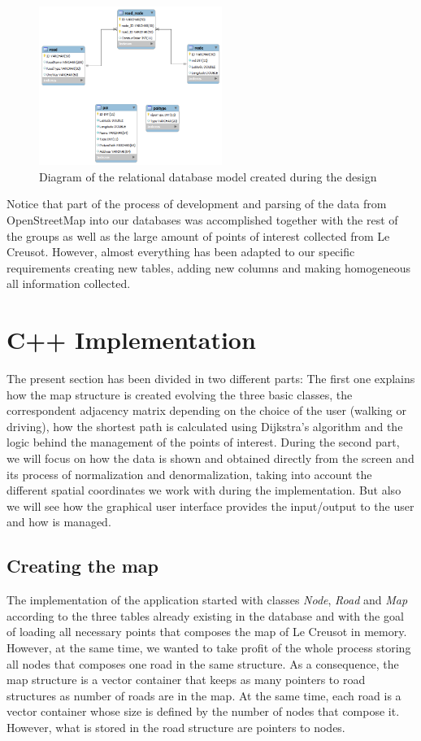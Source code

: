 \documentclass{article}
\begin{document}
\begin{figure}[h]
\centering
\includegraphics[width=0.53\textwidth]{big_schneider.png}
\caption{Diagram of the relational database model created during the design}
\label{fig:RelDBdiagram}
\end{figure}

Notice that part of the process of development and parsing of the data from OpenStreetMap into our databases was accomplished together with the rest of the groups as well as the large amount of points of interest collected from Le Creusot. However, almost everything has been adapted to our specific requirements creating new tables, adding new columns and making homogeneous all information collected. 

\clearpage
\section{C++ Implementation}
The present section has been divided in two different parts: The first one explains how the map structure is created evolving the three basic classes, the correspondent adjacency matrix depending on the choice of the user (walking or driving), how the shortest path is calculated using Dijkstra's algorithm and the logic behind the management of the points of interest. During the second part, we will focus on how the data is shown and obtained directly from the screen and its process of normalization and denormalization, taking into account the different spatial coordinates we work with during the implementation. But also we will see how the graphical user interface provides the input/output to the user and how is managed.

\subsection{Creating the map}
The implementation of the application started with classes \textit{Node}, \textit{Road} and \textit{Map} according to the three tables already existing in the database and with the goal of loading all necessary points that composes the map of Le Creusot in memory. However, at the same time, we wanted to take profit of the whole process storing all nodes that composes one road in the same structure. As a consequence, the map structure is a vector container that keeps as many pointers to road structures as number of roads are in the map. At the same time, each road is a vector container whose size is defined by the number of nodes that compose it. However, what is stored in the road structure are pointers to nodes.
\end{document}
